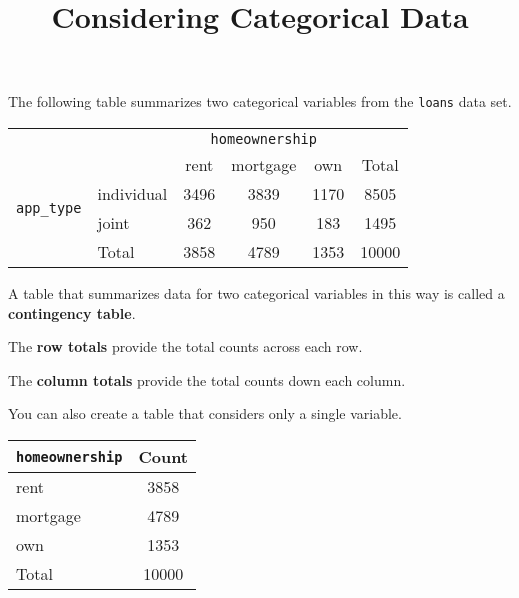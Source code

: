 \documentclass{beamer}
\title[MA205 - Section 2.2]{Considering Categorical Data}
\begin{document}
\begin{frame}
\titlepage
\end{frame}

\begin{frame}
\begin{example}\label{contingency table}
The following table summarizes two categorical variables from the \texttt{loans} data set.
\begin{center}
\begin{tabular}{llcccc}
&&\multicolumn{3}{c}{\texttt{homeownership}} &\\\cline{3-5}
&&rent&mortgage&own&Total\\\cline{2-6}
\multirow{2}{*}{{\texttt{app\_type}}} & individual & 3496 & 3839 & 1170 & 8505 \\
&joint & 362 & 950 & 183 & 1495 \\\cline{2-6}
&Total & 3858 & 4789 & 1353 & 10000 \\\cline{2-6}
\end{tabular}
\end{center}
\end{example}\pause

\begin{definition}
A table that summarizes data for two categorical variables in this way is called a \textbf{contingency table}.
\end{definition}\pause

\begin{definition}
The \textbf{row totals} provide the total counts across each row.

\vspace{1mm}
The \textbf{column totals} provide the total counts down each column.
\end{definition}
\end{frame}

\begin{frame}
\begin{note}
You can also create a table that considers only a single variable.
\end{note}\pause

\begin{example}
\begin{center}
\begin{tabular}{lc}\hline
\texttt{homeownership} & Count \\\hline
rent & 3858 \\
mortgage & 4789 \\
own & 1353 \\\hline
Total & 10000 \\\hline
\end{tabular}
\end{center}
\end{example}
\end{frame}
\end{document}
